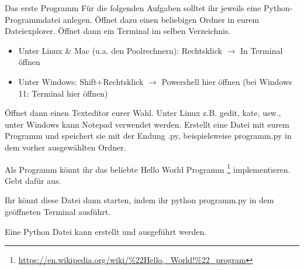 \begin{task}{Das erste Programm}
    Für die folgenden Aufgaben solltet ihr jeweils eine Python-Programmdatei
    anlegen.
    Öffnet dazu einen beliebigen Ordner in eurem Dateiexplorer.
    Öffnet dann ein Terminal im selben Verzeichnis.

    \begin{itemize}
        \item Unter Linux \& Mac (u.a. den Poolrechnern): Rechtsklick $\to$ In Terminal öffnen
        \item Unter Windows: Shift+Rechtsklick $\to$ Powershell hier öffnen (bei Windows 11: Terminal hier öffnen)
    \end{itemize}

    Öffnet dann einen Texteditor eurer Wahl. Unter Linux z.B.
    {\ttfamily gedit, kate, usw.}, unter Windows kann Notepad verwendet werden.
    Erstellt eine Datei mit eurem Programm und speichert sie mit der Endung
    {\ttfamily.py}, beispielsweise {\ttfamily programm.py}
    in dem vorher ausgewählten Ordner.

    Als Programm könnt ihr das beliebte Hello World Programm
    \footnote{\url{https://en.wikipedia.org/wiki/\%22Hello,_World!\%22_program}}
    implementieren.
    Gebt dafür  aus.

    Ihr könnt diese Datei dann starten,
    indem ihr {\ttfamily python programm.py} in dem geöffneten Terminal ausführt.

    \begin{solution}
        Eine Python Datei kann erstellt und ausgeführt werden.
    \end{solution}
\end{task}

